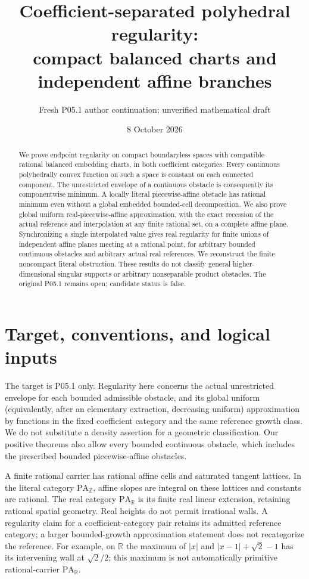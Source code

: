 \documentclass[11pt]{article}
\title{Coefficient-separated polyhedral regularity:\\compact balanced charts and independent affine branches}
\author{Fresh P05.1 author continuation; unverified mathematical draft}
\date{8 October 2026}
\theoremstyle{definition}\newtheorem{definition}[theorem]{Definition}
\theoremstyle{remark}\newtheorem{remark}[theorem]{Remark}
\newcommand{\R}{\mathbb R}\newcommand{\Q}{\mathbb Q}\newcommand{\Z}{\mathbb Z}
\newcommand{\PA}{\mathrm{PA}}\newcommand{\PC}{\mathrm{PC}}
\begin{document}
\maketitle
\begin{abstract}
We prove endpoint regularity on compact boundaryless spaces with compatible rational balanced embedding charts, in both coefficient categories. Every continuous polyhedrally convex function on such a space is constant on each connected component. The unrestricted envelope of a continuous obstacle is consequently its componentwise minimum. A locally literal piecewise-affine obstacle has rational minimum even without a global embedded bounded-cell decomposition. We also prove global uniform real-piecewise-affine approximation, with the exact recession of the actual reference and interpolation at any finite rational set, on a complete affine plane. Synchronizing a single interpolated value gives real regularity for finite unions of independent affine planes meeting at a rational point, for arbitrary bounded continuous obstacles and arbitrary actual real references. We reconstruct the finite noncompact literal obstruction. These results do not classify general higher-dimensional singular supports or arbitrary nonseparable product obstacles. The original P05.1 remains open; candidate status is false.
\end{abstract}

\section{Target, conventions, and logical inputs}
The target is P05.1 only. Regularity here concerns the actual unrestricted envelope for each bounded admissible obstacle, and its global uniform (equivalently, after an elementary extraction, decreasing uniform) approximation by functions in the fixed coefficient category and the same reference growth class. We do not substitute a density assertion for a geometric classification. Our positive theorems also allow every bounded continuous obstacle, which includes the prescribed bounded piecewise-affine obstacles.

A finite rational carrier has rational affine cells and saturated tangent lattices. In the literal category $\PA_\Z$, affine slopes are integral on these lattices and constants are rational. The real category $\PA_\R$ is its finite real linear extension, retaining rational spatial geometry. Real heights do not permit irrational walls. A regularity claim for a coefficient-category pair retains its admitted reference category; a larger bounded-growth approximation statement does not recategorize the reference. For example, on $\R$ the maximum of $|x|$ and $|x-1|+\sqrt2-1$ has its intervening wall at $\sqrt2/2$; this maximum is not automatically primitive rational-carrier $\PA_\R$.
\end{document}
